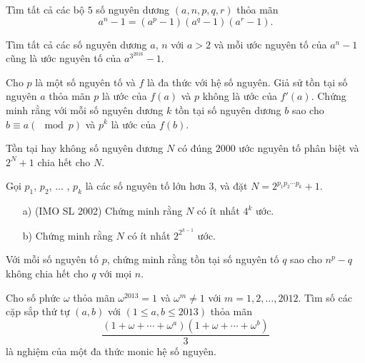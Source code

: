 \begin{bt}
	Tìm tất cả các bộ $5$ số nguyên dương $(a,n,p,q,r)$ thỏa mãn $$a^n-1=(a^p-1)(a^q-1)(a^r-1).$$
\end{bt}

\begin{bt}[VN TST 2016] 
	Tìm tất cả các số nguyên dương $a$, $n$ với $a>2$ và mỗi ước nguyên tố của $a^{n}-1$ cũng là ước nguyên tố của $a^{3^{2016}}-1$. 
	
\end{bt}

\begin{bt}[Bổ đề Hensel]
	Cho $p$  là một số nguyên tố và $f$ là đa thức với hệ số nguyên. Giả sử tồn tại số nguyên $a$ thỏa mãn $p$ là ước của $f(a)$ và $p$ không là ước của $f'(a)$. Chứng minh rằng với mỗi số nguyên dương $k$ tồn tại số nguyên dương $b$ sao cho $b \equiv a \left( \mod p \right) $ và $p^k $ là ước của $f(b)$.
\end{bt}

\begin{bt}[IMO 2000]
	Tồn tại hay không số nguyên dương $N$ có đúng $2000$ ước nguyên tố phân biệt và $2^{N}+1$ chia hết cho $N$.
\end{bt}

\begin{bt} 
	Gọi $p_1$, $p_2$, $\ldots$ , $p_k$ là các số nguyên tố lớn hơn $3$, và đặt $N=2^{p_1p_2\cdots p_k}+1$. 
	\begin{itemize}
		\item[a)] (IMO SL 2002) Chứng minh rằng $N$ có ít nhất $4^{k}$ ước.
		\item[b)] Chứng minh rằng $N$ có ít nhất $2^{2^{k-1}}$ ước.
	\end{itemize}
\end{bt}

\begin{bt}[IMO 2003 P6]
	Với mỗi số nguyên tố $p$, chứng minh rằng tồn tại số nguyên tố $q$ sao cho $n^{p}-q$ không chia hết cho $q$ với mọi $n$.
\end{bt}

\begin{bt}
	Cho số phức $\omega$ thỏa mãn $\omega^{2013}=1$ và $\omega^{m}\ne 1$ với $m=1,2,\ldots, 2012$. Tìm số các cặp sắp thứ tự $(a,b)$ với $(1\le a, b \le 2013)$ thỏa mãn $$\dfrac{\left( 1+\omega+\cdots+\omega^{a} \right)\left( 1+\omega+\cdots+\omega^{b} \right)}{3}$$ là nghiệm của một đa thức monic hệ số nguyên.
\end{bt}

